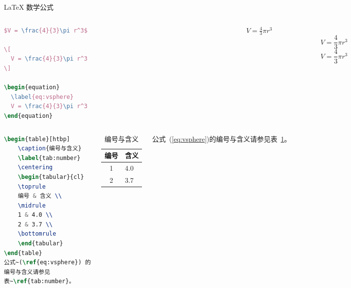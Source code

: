 \documentclass[no-math]{ctexbeamer}
\begin{document}
\begin{frame}[fragile]{\LaTeX{} 数学公式}
	\begin{columns}
		\begin{column}{.55\textwidth}
\begin{lstlisting}[language=TeX]
$V = \frac{4}{3}\pi r^3$

\[
  V = \frac{4}{3}\pi r^3
\]

\begin{equation}
  \label{eq:vsphere}
  V = \frac{4}{3}\pi r^3
\end{equation}
\end{lstlisting}
		\end{column}
		\begin{column}{.4\textwidth}
			$V = \frac{4}{3}\pi r^3$
			\[
				V = \frac{4}{3}\pi r^3
			\]
			\begin{equation}
				\label{eq:vsphere}
				V = \frac{4}{3}\pi r^3
			\end{equation}
		\end{column}
	\end{columns}
\end{frame}

\begin{frame}[fragile]
	\begin{columns}
		\column{.6\textwidth}
\begin{lstlisting}[language=TeX]
\begin{table}[htbp]
    \caption{编号与含义}
    \label{tab:number}
    \centering
    \begin{tabular}{cl}
    \toprule
    编号 & 含义 \\
    \midrule
    1 & 4.0 \\
    2 & 3.7 \\
    \bottomrule
    \end{tabular}
\end{table}
公式~(\ref{eq:vsphere}) 的
编号与含义请参见
表~\ref{tab:number}。
\end{lstlisting}
		\column{.4\textwidth}
		\begin{table}[htpb]
			\centering
			\caption{编号与含义}
			\label{tab:number}
			\begin{tabular}{cl}\toprule
				编号 & 含义 \\\midrule
				1 & 4.0\\
				2 & 3.7\\\bottomrule
			\end{tabular}
		\end{table}
		\normalsize 公式~(\ref{eq:vsphere})的编号与含义请参见表~\ref{tab:number}。
	\end{columns}
\end{frame}
\end{document}
